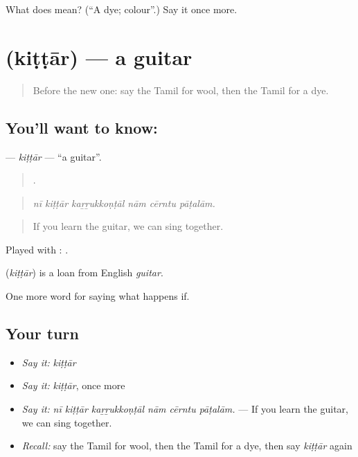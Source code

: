 \begin{tcolorbox}[breakable,colback=teal!4,colframe=teal!35!black,title={Before you move on}]
What does  mean? (\textquotedblleft{}A dye; colour\textquotedblright{}.) Say it once more.
\end{tcolorbox}
\section[\texorpdfstring{\ta{கிட்டார்} (kiṭṭār)}{கிட்டார் (kiṭṭār)}]{ (kiṭṭār) — a guitar}

\label{lesson:TA-C557-kittar}



\begin{quote}
Before the new one: say the Tamil for wool, then the Tamil for a dye.
\end{quote}

\subsection*{You'll want to know: }
\textbf{} — \emph{kiṭṭār} — \textquotedblleft{}a guitar\textquotedblright{}.

\begin{quote}
     .
\end{quote}

\begin{quote}
\emph{nī kiṭṭār kaṟṟukkoṇṭāl nām cērntu pāṭalām.}
\end{quote}

\begin{quote}
If you learn the guitar, we can sing together.
\end{quote}

Played with :  .

\begin{cousinweb}
\textbf{} (\emph{kiṭṭār}) is a loan from English \emph{guitar}.
\end{cousinweb}

\begin{grammarlens}[title={What you've built}]
One more word for saying what happens if.
\end{grammarlens}

\subsection*{Your turn}
\begin{itemize}
\raggedright
  \item \emph{Say it:} \emph{kiṭṭār}
  \item \emph{Say it:} \emph{kiṭṭār}, once more
  \item \emph{Say it:} \emph{nī kiṭṭār kaṟṟukkoṇṭāl nām cērntu pāṭalām.} — If you learn the guitar, we can sing together.
  \item \emph{Recall:} say the Tamil for wool, then the Tamil for a dye, then say \emph{kiṭṭār} again
\end{itemize}

